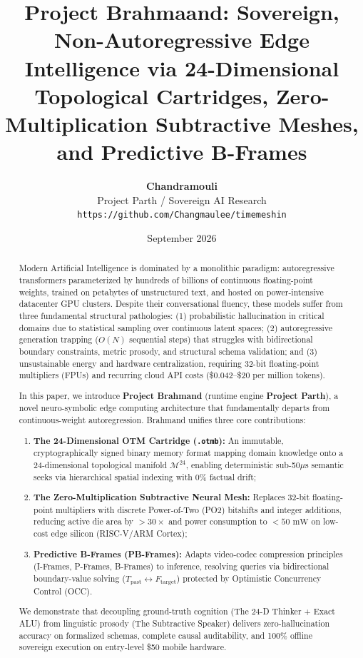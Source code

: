 \documentclass[11pt,a4paper]{article}
\title{\textbf{Project Brahmaand: Sovereign, Non-Autoregressive Edge Intelligence via 24-Dimensional Topological Cartridges, Zero-Multiplication Subtractive Meshes, and Predictive B-Frames}}
\author{
  \textbf{Chandramouli} \\
  Project Parth / Sovereign AI Research \\
  \texttt{https://github.com/Changmaulee/timemeshin}
}
\date{September 2026}
\theoremstyle{definition}
\begin{document}
\maketitle

\begin{abstract}
Modern Artificial Intelligence is dominated by a monolithic paradigm: autoregressive transformers parameterized by hundreds of billions of continuous floating-point weights, trained on petabytes of unstructured text, and hosted on power-intensive datacenter GPU clusters. Despite their conversational fluency, these models suffer from three fundamental structural pathologies: (1) probabilistic hallucination in critical domains due to statistical sampling over continuous latent spaces; (2) autoregressive generation trapping ($O(N)$ sequential steps) that struggles with bidirectional boundary constraints, metric prosody, and structural schema validation; and (3) unsustainable energy and hardware centralization, requiring 32-bit floating-point multipliers (FPUs) and recurring cloud API costs (\$0.042--\$20 per million tokens).

In this paper, we introduce \textbf{Project Brahmand} (runtime engine \textbf{Project Parth}), a novel neuro-symbolic edge computing architecture that fundamentally departs from continuous-weight autoregression. Brahmand unifies three core contributions:
\begin{enumerate}
    \item \textbf{The 24-Dimensional OTM Cartridge (\texttt{.otmb}):} An immutable, cryptographically signed binary memory format mapping domain knowledge onto a 24-dimensional topological manifold $\mathcal{M}^{24}$, enabling deterministic sub-50$\mu$s semantic seeks via hierarchical spatial indexing with 0\% factual drift;
    \item \textbf{The Zero-Multiplication Subtractive Neural Mesh:} Replaces 32-bit floating-point multipliers with discrete Power-of-Two (PO2) bitshifts and integer additions, reducing active die area by $>30\times$ and power consumption to $<50\text{ mW}$ on low-cost edge silicon (RISC-V/ARM Cortex);
    \item \textbf{Predictive B-Frames (PB-Frames):} Adapts video-codec compression principles (I-Frames, P-Frames, B-Frames) to inference, resolving queries via bidirectional boundary-value solving ($T_{\text{past}} \leftrightarrow F_{\text{target}}$) protected by Optimistic Concurrency Control (OCC).
\end{enumerate}
We demonstrate that decoupling ground-truth cognition (The 24-D Thinker + Exact ALU) from linguistic prosody (The Subtractive Speaker) delivers zero-hallucination accuracy on formalized schemas, complete causal auditability, and 100\% offline sovereign execution on entry-level \$50 mobile hardware.
\end{abstract}
\end{document}
